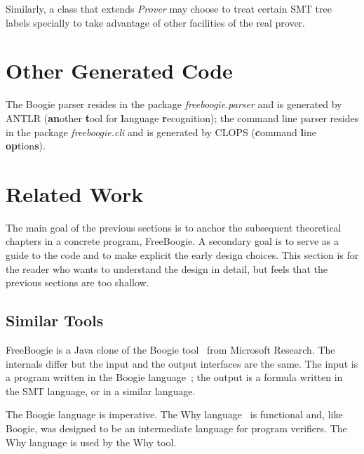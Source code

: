 \documentclass{llncs}
\def\fb#1{{\bf #1}} %
\begin{document}
Similarly, a class that extends \textit{Prover} may choose to
treat certain SMT tree labels specially to take advantage of
other facilities of the real prover.

\section{Other Generated Code}

The Boogie parser resides in the package
\textit{freeboogie.parser} and is generated by ANTLR
(\textbf{an}other \fb tool for \fb language \fb
recognition); the command line parser resides in the package
\textit{freeboogie.cli} and is generated by CLOPS (\fb command
\fb line \textbf{op}tion\textbf{s}).

\section{Related Work}

The main goal of the previous sections is to anchor the
subsequent theoretical chapters in a concrete program,
FreeBoogie. A secondary goal is to serve as a guide to the code
and to make explicit the early design choices. This section is
for the reader who wants to understand the design in detail, but
feels that the previous sections are too shallow.

\subsection{Similar Tools}

FreeBoogie is a Java clone of the Boogie
tool~\cite{barnett2005boogie} from Microsoft Research. The
internals differ but the input and the output interfaces
are the same. The input is a program written in the Boogie
language~\cite{leino2008boogie,leino2010boogie}; the output is a
formula written in the SMT language, or in a similar language.

The Boogie language is imperative. The Why
language~\cite{filliatre2007why} is functional and, like
Boogie, was designed to be an intermediate language for program
verifiers. The Why language is used by the Why tool.
\end{document}
